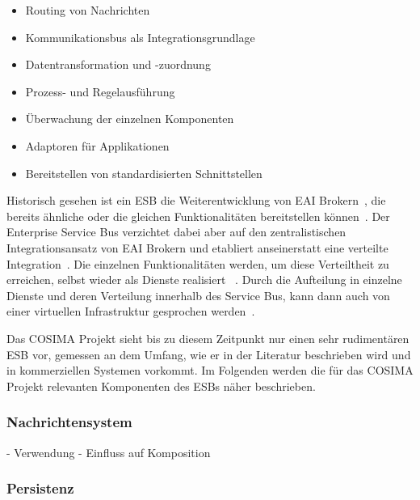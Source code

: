   \begin{itemize}
    \item Routing von Nachrichten
    \item Kommunikationsbus als Integrationsgrundlage
    \item Datentransformation und -zuordnung
    \item Prozess- und Regelausführung
    \item Überwachung der einzelnen Komponenten
    \item Adaptoren für Applikationen
    \item Bereitstellen von standardisierten Schnittstellen
  \end{itemize}

  Historisch gesehen ist ein ESB die Weiterentwicklung von EAI Brokern~, die bereits ähnliche oder die gleichen Funktionalitäten bereitstellen können~\citep[S. 146]{masak2007ssb}. Der Enterprise Service Bus verzichtet dabei aber auf den zentralistischen Integrationsansatz von EAI Brokern und etabliert anseinerstatt eine verteilte Integration~\citep[S. 4]{enterprise_service_bus}. Die einzelnen Funktionalitäten werden, um diese Verteiltheit zu erreichen, selbst wieder als Dienste realisiert ~\citep{enterprise_service_bus,masak2007ssb,papazoglou2007soc}. Durch die Aufteilung in einzelne Dienste und deren Verteilung innerhalb des Service Bus, kann dann auch von einer virtuellen Infrastruktur gesprochen werden~\citep[S. 136]{soa_goes_real}.
  
  Das COSIMA Projekt sieht bis zu diesem Zeitpunkt nur einen sehr rudimentären ESB vor, gemessen an dem Umfang, wie er in der Literatur beschrieben wird und in kommerziellen Systemen vorkommt. Im Folgenden werden die für das COSIMA Projekt relevanten Komponenten des ESBs näher beschrieben.
  
\subsubsection{Nachrichtensystem} %
\label{ssub:nachrichtensystem}

  - Verwendung
  - Einfluss auf Komposition


\subsubsection{Persistenz} %
\label{ssub:persistenz}

